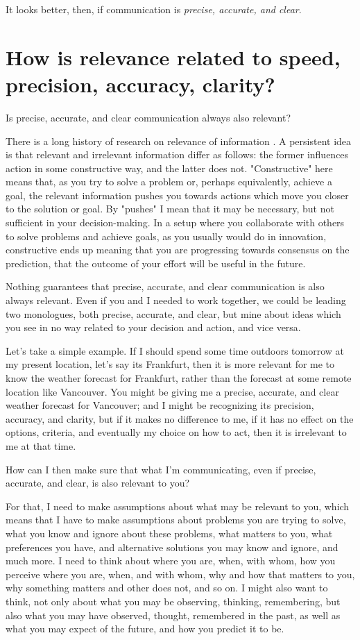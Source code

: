 It looks better, then, if communication is \textit{precise, accurate, and clear}.


\section{How is relevance related to speed, precision, accuracy, clarity?}
\label{c2:s6}
Is precise, accurate, and clear communication always also relevant?

There is a long history of research on relevance of information \cite{sperber1986relevance,sperber1995relevance,mizzaro1997relevance}. A persistent idea is that relevant and irrelevant information differ as follows: the former influences action in some constructive way, and the latter does not. "Constructive" here means that, as you try to solve a problem or, perhaps equivalently, achieve a goal, the relevant information pushes you towards actions which move you closer to the solution or goal. By "pushes" I mean that it may be necessary, but not sufficient in your decision-making. In a setup where you collaborate with others to solve problems and achieve goals, as you usually would do in innovation, constructive ends up meaning that you are progressing towards consensus on the prediction, that the outcome of your effort will be useful in the future.

Nothing guarantees that precise, accurate, and clear communication is also always relevant. Even if you and I needed to work together, we could be leading two monologues, both precise, accurate, and clear, but mine about ideas which you see in no way related to your decision and action, and vice versa.

Let's take a simple example. If I should spend some time outdoors tomorrow at my present location, let's say its Frankfurt, then it is more relevant for me to know the weather forecast for Frankfurt, rather than the forecast at some remote location like Vancouver. You might be giving me a precise, accurate, and clear weather forecast for Vancouver; and I might be recognizing its precision, accuracy, and clarity, but if it makes no difference to me, if it has no effect on the options, criteria, and eventually my choice on how to act, then it is irrelevant to me at that time.

How can I then make sure that what I'm communicating, even if precise, accurate, and clear, is also relevant to you? 

For that, I need to make assumptions about what may be relevant to you, which means that I have to make assumptions about problems you are trying to solve, what you know and ignore about these problems, what matters to you, what preferences you have, and alternative solutions you may know and ignore, and much more. I need to think about where you are, when, with whom, how you perceive where you are, when, and with whom, why and how that matters to you, why something matters and other does not, and so on. I might also want to think, not only about what you may be observing, thinking, remembering, but also what you may have observed, thought, remembered in the past, as well as what you may expect of the future, and how you predict it to be. 

